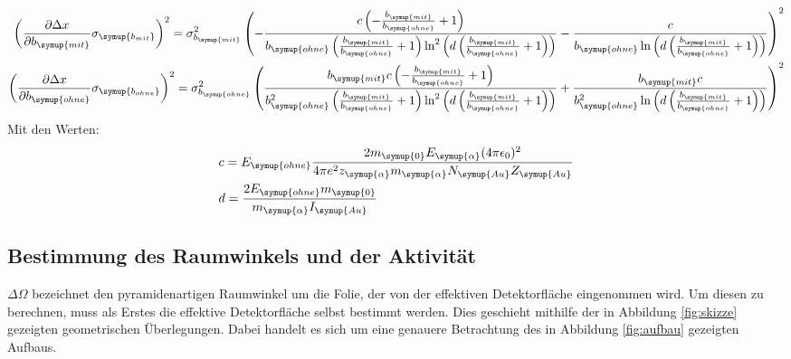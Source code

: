 \begin{align*}
  \left(\frac{\partial \Delta x}{\partial b_{\symup{mit}}}\sigma_{\symup{b_{mit}}}\right)^2 = \sigma_{b_{\symup{mit}}}^{2} \left(- \frac{c \left(- \frac{b_{\symup{mit}}}{b_{\symup{ohne}}} + 1\right)}{b_{\symup{ohne}} \left(\frac{b_{\symup{mit}}}{b_{\symup{ohne}}} + 1\right) \ln^{2}{\left (d \left(\frac{b_{\symup{mit}}}{b_{\symup{ohne}}} + 1\right) \right )}} - \frac{c}{b_{\symup{ohne}} \ln{\left (d \left(\frac{b_{\symup{mit}}}{b_{\symup{ohne}}} + 1\right) \right )}}\right)^{2} \\
  \left(\frac{\partial \Delta x}{\partial b_{\symup{ohne}}}\sigma_{\symup{b_{ohne}}}\right)^2 = \sigma_{b_{\symup{ohne}}}^{2} \left(\frac{b_{\symup{mit}} c \left(- \frac{b_{\symup{mit}}}{b_{\symup{ohne}}} + 1\right)}{b_{\symup{ohne}}^{2} \left(\frac{b_{\symup{mit}}}{b_{\symup{ohne}}} + 1\right) \ln^{2}{\left (d \left(\frac{b_{\symup{mit}}}{b_{\symup{ohne}}} + 1\right) \right )}} + \frac{b_{\symup{mit}} c}{b_{\symup{ohne}}^{2} \ln{\left (d \left(\frac{b_{\symup{mit}}}{b_{\symup{ohne}}} + 1\right) \right )}}\right)^{2}
\end{align*}
Mit den Werten:
\begin{align*}
  &c =  E_{\symup{ohne}} \frac{2 m_{\symup{0}} E_{\symup{\alpha}} (4 \pi \epsilon_0)^2}{4 \pi e^2 z_{\symup{\alpha}}  m_{\symup{\alpha}} N_{\symup{Au}} Z_{\symup{Au}}} \\
  &d = \frac{2 E_{\symup{ohne}} m_{\symup{0}}}{m_{\symup{\alpha}} I_{\symup{Au}}}
\end{align*}

\subsection{Bestimmung des Raumwinkels und der Aktivität}

$\Delta \Omega$ bezeichnet den pyramidenartigen Raumwinkel um die Folie, der von
der effektiven Detektorfläche eingenommen wird. Um diesen zu berechnen, muss
als Erstes die effektive Detektorfläche selbst bestimmt werden. Dies geschieht
mithilfe der in Abbildung \ref{fig:skizze} gezeigten geometrischen Überlegungen.
Dabei handelt es sich um eine genauere Betrachtung des in Abbildung \ref{fig:aufbau}
gezeigten Aufbaus.

